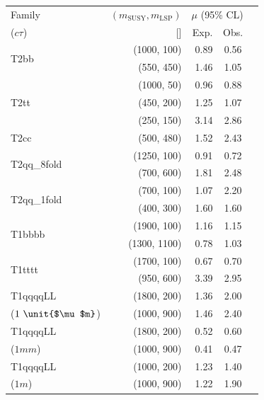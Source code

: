 \clearpage
\begin{table}
  \label{tab:benchmarks_aux}
  \centering
    \begin{tabular}{ lrrcc }
      \hline
      Family
      & $(m_{\text{SUSY}}, m_{\mathrm{LSP}})$
      & \multicolumn{2}{c}{$\mu$ (95\% CL)}                                                                            \\ [0.3ex]
      ($c\tau$)
      & [\GeVns{}]
      & Exp.
      & Obs.                                                                                                           \\ [0.3ex]
      \hline
      \multirow{2}{*}{T2bb} & (1000, 100) & 0.89 & 0.56 \\ & (550, 450)  & 1.46 & 1.05 \\ [0.5ex]
      \multirow{3}{*}{T2tt} & (1000, 50)  & 0.96 & 0.88 \\ & (450, 200)  & 1.25 & 1.07 \\ & (250, 150)  & 3.14 & 2.86 \\ [0.5ex]
      \multirow{1}{*}{T2cc} & (500, 480)  & 1.52 & 2.43 \\ [0.5ex]
      \multirow{2}{*}{T2qq\_8fold} & (1250, 100) & 0.91 & 0.72 \\ & (700, 600)  & 1.81 & 2.48 \\ [0.5ex]
      \multirow{2}{*}{T2qq\_1fold} & (700, 100)  & 1.07 & 2.20 \\ & (400, 300)  & 1.60 & 1.60 \\ [0.5ex]
      \multirow{2}{*}{T1bbbb} & (1900, 100) & 1.16 & 1.15 \\ & (1300, 1100) & 0.78 & 1.03 \\ [0.5ex]
      \multirow{2}{*}{T1tttt} & (1700, 100) & 0.67 & 0.70 \\ & (950, 600)  & 3.39 & 2.95 \\ [0.5ex]
	    T1qqqqLL & (1800, 200) & 1.36 & 2.00 \\ ($1~\unit{$\mu$m}$) & (1000, 900) & 1.46 & 2.40 \\ [0.5ex]
      T1qqqqLL & (1800, 200) & 0.52 & 0.60 \\ ($1\unit{mm}$) & (1000, 900) & 0.41 & 0.47 \\ [0.5ex]
      T1qqqqLL & (1000, 200) & 1.23 & 1.40 \\ ($1\unit{m}$) & (1000, 900) & 1.22 & 1.90 \\
      \hline
    \end{tabular}
\end{table}

